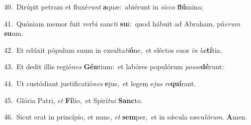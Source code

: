 {\numbfont\textcolor{\numbcolor}{40.}}~Dirúpit petram et fluxé\textit{runt} \textbf{a}\-quæ:~\star abiérunt in \textit{sic}\-\textit{co} \textbf{flú}\-mina;\par
{\numbfont\textcolor{\numbcolor}{41.}}~Quóniam memor fuit verbi sanc\textit{ti} \textbf{su}\-i:~\star quod hábuit ad Abraham, pú\-\textit{e}\-\textit{rum} \textbf{su}\-um.\par
{\numbfont\textcolor{\numbcolor}{42.}}~Et edúxit pópulum suum in exsulta\-\textit{ti}\-\textbf{ó}ne,~\star et eléctos suos \textit{in} \textit{læ}\-\textbf{tí}tia.\par
{\numbfont\textcolor{\numbcolor}{43.}}~Et dedit illis regió\textit{nes} \textbf{Gén}\-tium:~\star et labóres populórum \textit{pos}\-\textit{se}\textbf{dé}runt:\par
{\numbfont\textcolor{\numbcolor}{44.}}~Ut custódiant justificatió\textit{nes} \textbf{e}\-jus,~\star et legem e\textit{jus} \textit{re}\-\textbf{quí}rant.\par
{\numbfont\textcolor{\numbcolor}{45.}}~Glória Patri, \textit{et} \textbf{Fí}\-lio,~\star et Spirí\-\textit{tu}\-\textit{i} \textbf{Sanc}\-to.\par
{\numbfont\textcolor{\numbcolor}{46.}}~Sicut erat in princípio, et nunc, \textit{et} \textbf{sem}\-per,~\star et in sǽcula sæcu\-\textit{ló}\-\textit{rum}. \textbf{A}\-men.\par
